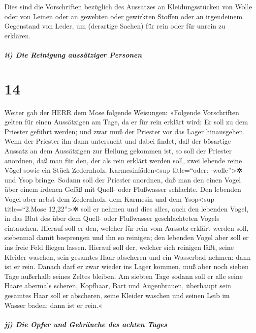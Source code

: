 Dies sind die Vorschriften bezüglich des Aussatzes an
Kleidungsstücken von Wolle oder von Leinen oder an gewebten oder
gewirkten Stoffen oder an irgendeinem Gegenstand von Leder, um
(derartige Sachen) für rein oder für unrein zu erklären.

\hypertarget{ii-die-reinigung-aussuxe4tziger-personen}{%
\subparagraph{ii) Die Reinigung aussätziger
Personen}\label{ii-die-reinigung-aussuxe4tziger-personen}}

\hypertarget{section-13}{%
\section{14}\label{section-13}}

Weiter gab der HERR dem Mose folgende Weisungen:
»Folgende Vorschriften gelten für einen Aussätzigen am
Tage, da er für rein erklärt wird: Er soll zu dem Priester geführt
werden; und zwar muß der Priester vor das Lager
hinausgehen. Wenn der Priester ihn dann untersucht und dabei findet, daß
der bösartige Aussatz an dem Aussätzigen zur Heilung gekommen ist,
so soll der Priester anordnen, daß man für den, der als
rein erklärt werden soll, zwei lebende reine Vögel sowie ein Stück
Zedernholz, Karmesinfäden\textless sup title=``oder:
-wolle''\textgreater✲ und Ysop bringe. Sodann soll der
Priester anordnen, daß man den einen Vogel über einem irdenen Gefäß mit
Quell- oder Flußwasser schlachte. Den lebenden Vogel aber
nebst dem Zedernholz, dem Karmesin und dem Ysop\textless sup
title=``2.Mose 12,22''\textgreater✲ soll er nehmen und dies alles, auch
den lebenden Vogel, in das Blut des über dem Quell- oder Flußwasser
geschlachteten Vogels eintauchen. Hierauf soll er den,
welcher für rein vom Aussatz erklärt werden soll, siebenmal damit
besprengen und ihn so reinigen; den lebenden Vogel aber soll er ins
freie Feld fliegen lassen. Hierauf soll der, welcher sich
reinigen läßt, seine Kleider waschen, sein gesamtes Haar abscheren und
ein Wasserbad nehmen: dann ist er rein. Danach darf er zwar wieder ins
Lager kommen, muß aber noch sieben Tage außerhalb seines Zeltes bleiben.
Am siebten Tage sodann soll er alle seine Haare abermals
scheren, Kopfhaar, Bart und Augenbrauen, überhaupt sein gesamtes Haar
soll er abscheren, seine Kleider waschen und seinen Leib im Wasser
baden: dann ist er rein.«

\hypertarget{jj-die-opfer-und-gebruxe4uche-des-achten-tages}{%
\subparagraph{jj) Die Opfer und Gebräuche des achten
Tages}\label{jj-die-opfer-und-gebruxe4uche-des-achten-tages}}

